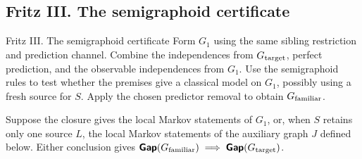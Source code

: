\subsection{Fritz III. The semigraphoid certificate}\label{sec:semigraphoid}
\begin{piggyback}{Fritz III. The semigraphoid certificate}
Form \(G_1\) using the same sibling restriction and prediction channel.
Combine the independences from \(G_{\text{target}}\), perfect prediction, and
the observable independences from \(G_1\). Use the semigraphoid rules
to test whether the premises give a classical model on \(G_1\), possibly
using a fresh source for \(S\). Apply the chosen predictor removal to
obtain \(G_{\text{familiar}}\).
\end{piggyback}
\begin{proposition}\label{prop:semigraphoid}
Suppose the closure gives the local Markov statements of \(G_1\), or,
when \(S\) retains only one source \(L\), the local Markov statements
of the auxiliary graph \(J\) defined below. Either conclusion gives
\(\operatorname{\text{\normalfont\sffamily\bfseries Gap}}(G_{\text{familiar}})\implies\operatorname{\text{\normalfont\sffamily\bfseries Gap}}(G_{\text{target}})\).
\end{proposition}
